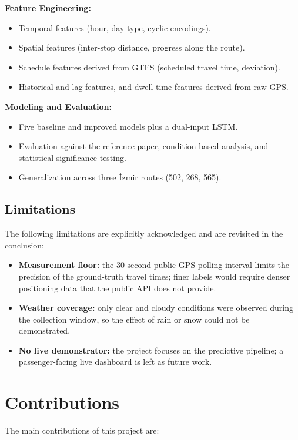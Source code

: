 \textbf{Feature Engineering:}
\begin{itemize}
    \item Temporal features (hour, day type, cyclic encodings).
    \item Spatial features (inter-stop distance, progress along the route).
    \item Schedule features derived from GTFS (scheduled travel time, deviation).
    \item Historical and lag features, and dwell-time features derived from raw GPS.
\end{itemize}

\textbf{Modeling and Evaluation:}
\begin{itemize}
    \item Five baseline and improved models plus a dual-input LSTM.
    \item Evaluation against the reference paper, condition-based analysis, and statistical significance testing.
    \item Generalization across three İzmir routes (502, 268, 565).
\end{itemize}

\subsection{Limitations}

The following limitations are explicitly acknowledged and are revisited in the conclusion:

\begin{itemize}
    \item \textbf{Measurement floor:} the 30-second public GPS polling interval limits the precision of the ground-truth travel times; finer labels would require denser positioning data that the public API does not provide.
    \item \textbf{Weather coverage:} only clear and cloudy conditions were observed during the collection window, so the effect of rain or snow could not be demonstrated.
    \item \textbf{No live demonstrator:} the project focuses on the predictive pipeline; a passenger-facing live dashboard is left as future work.
\end{itemize}

\section{Contributions}

The main contributions of this project are:

